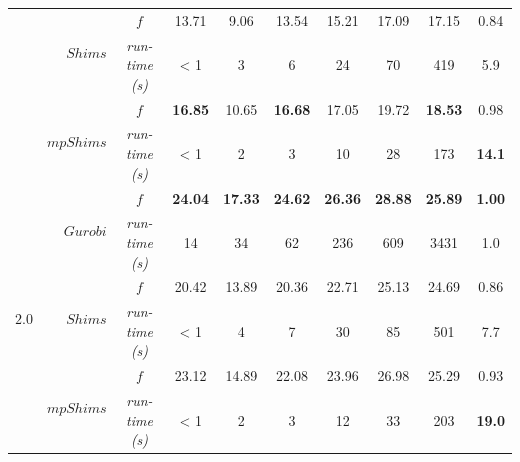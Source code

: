\documentclass[preprint,authoryear]{elsarticle}
\begin{document}
\begin{table}[H]
\begin{tabular}{crcccccccc}
\cmidrule{2-10}		                       
&\multirow{2}{*}{ $Shims$}                       & $f$                & 13.71       &  9.06       &  13.54      &  15.21      &   17.09     &  17.15       & 0.84\\%
&                                                & {\it run-time (s)} &  < 1        &  3          &    6        &   24        &   70        &  419         & 5.9\\%

\cmidrule{2-10}		                       
&\multirow{2}{*}{ $mpShims$}                     & $f$                & {\bf 16.85} & 10.65       & {\bf 16.68} & 17.05       & 19.72       & {\bf 18.53}  & 0.98\\%
&                                                & {\it run-time (s)} &  < 1        &  2          &    3        &   10        &   28        &   173        & {\bf 14.1}\\%

\midrule
\multirow{7}{*}{$2.0$}&\multirow{2}{*}{ $Gurobi$}& $f$                & {\bf 24.04} & {\bf 17.33} & {\bf 24.62} & {\bf 26.36} & {\bf 28.88} & {\bf 25.89}  & {\bf 1.00}\\%
&                                                & {\it run-time (s)} &  14         &   34        &  62         &  236        &  609        & 3431         & 1.0\\%

\cmidrule{2-10}		                       
&\multirow{2}{*}{ $Shims$}                       & $f$                & 20.42       &  13.89      &  20.36      &  22.71      &   25.13     & 24.69        & 0.86\\%
&                                                & {\it run-time (s)} &  < 1        &  4          &    7        &   30        &   85        &  501         & 7.7\\%

\cmidrule{2-10}		                       
&\multirow{2}{*}{ $mpShims$}                     & $f$                & 23.12       & 14.89       & 22.08       & 23.96       & 26.98       & 25.29        &  0.93\\%
&                                                & {\it run-time (s)} &  < 1        &  2          &    3        &   12        &   33        &  203         & {\bf 19.0}\\%

\bottomrule	

\end{tabular}
\normalsize
\end{table}
\end{document}
